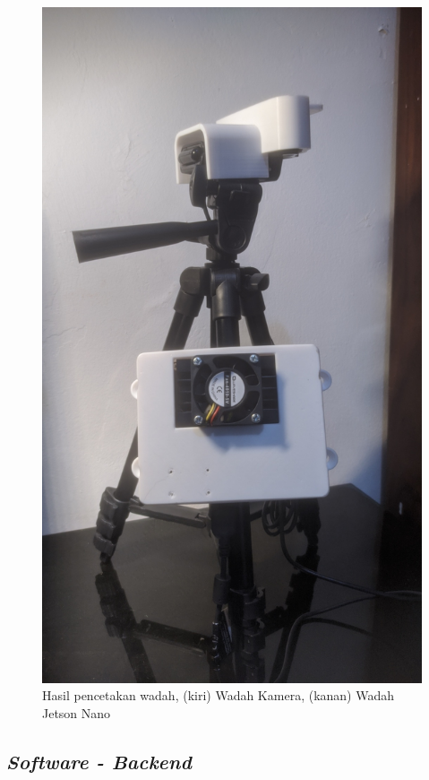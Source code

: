 \begin{figure}[htbp]
  \includegraphics[scale=0.15,angle=-90]{gambar/bab3-case-jnano-printed.jpg}

  \caption{\centering Hasil pencetakan wadah, (kiri) Wadah Kamera, (kanan) Wadah Jetson Nano}
  \label{fig:printcontainer}
\end{figure}

\subsection{\emph{Software - Backend}}

